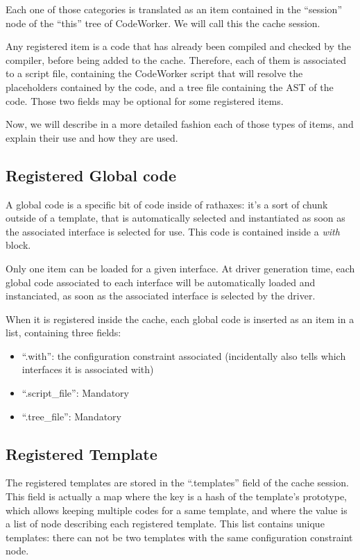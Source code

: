 \documentclass[american]{rtxreport}
\begin{document}
Each one of those categories is translated as an item contained in the
``session'' node of the ``this'' tree of CodeWorker. We will call this the
cache session.

Any registered item is a code that has already been compiled and checked by the
compiler, before being added to the cache. Therefore, each of them is
associated to a script file, containing the CodeWorker script that will resolve
the placeholders contained by the code, and a tree file containing the AST of
the code. Those two fields may be optional for some registered items.

Now, we will describe in a more detailed fashion each of those types of items,
and explain their use and how they are used.


\subsection{Registered Global code}

A global code is a specific bit of code inside of rathaxes: it's a sort of
chunk outside of a template, that is automatically selected and instantiated as
soon as the associated interface is selected for use. This code is contained
inside a \emph{with} block.

Only one item can be loaded for a given interface. At driver generation time,
each global code associated to each interface will be automatically loaded and
instanciated, as soon as the associated interface is selected by the driver.

When it is registered inside the cache, each global code is inserted as an item
in a list, containing three fields:
\begin{itemize}
    \item ``.with'': the configuration constraint associated (incidentally also
            tells which interfaces it is associated with)
    \item ``.script\_file'': Mandatory
    \item ``.tree\_file'': Mandatory
\end{itemize}


\subsection{Registered Template}

The registered templates are stored in the ``.templates'' field of the cache
session. This field is actually a map where the key is a hash of the template's
prototype, which allows keeping multiple codes for a same template, and where
the value is a list of node describing each registered template. This list
contains unique templates: there can not be two templates with the same
configuration constraint node.
\end{document}
